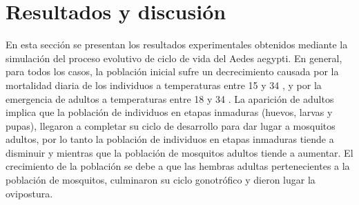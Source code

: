 \section{Resultados y discusión}
En esta sección se presentan los resultados experimentales obtenidos mediante la simulación del
proceso evolutivo de ciclo de vida del Aedes aegypti. En general, para todos los casos, la
población inicial sufre un decrecimiento causada por la mortalidad diaria de los individuos a
temperaturas entre 15 y 34 \textcelsius, y por la emergencia de adultos a temperaturas entre 18 y
34 \textcelsius. La aparición de adultos implica que la población de individuos en etapas
inmaduras (huevos, larvas y pupas), llegaron a completar su ciclo de desarrollo para dar lugar a
mosquitos adultos, por lo tanto la población de individuos en etapas inmaduras tiende a disminuir
y mientras que la población de mosquitos adultos tiende a aumentar. El crecimiento de la población
se debe a que las hembras adultas pertenecientes a la población de mosquitos, culminaron su ciclo
gonotrófico y dieron lugar la ovipostura.

